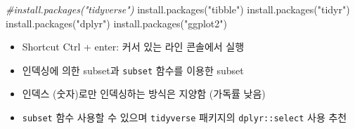 \documentclass[
]{book}
\newenvironment{Shaded}{\begin{snugshade}}{\end{snugshade}}
\newcommand{\AttributeTok}[1]{\textcolor[rgb]{0.77,0.63,0.00}{#1}}
\newcommand{\CommentTok}[1]{\textcolor[rgb]{0.56,0.35,0.01}{\textit{#1}}}
\newcommand{\ConstantTok}[1]{\textcolor[rgb]{0.00,0.00,0.00}{#1}}
\newcommand{\DecValTok}[1]{\textcolor[rgb]{0.00,0.00,0.81}{#1}}
\newcommand{\DocumentationTok}[1]{\textcolor[rgb]{0.56,0.35,0.01}{\textbf{\textit{#1}}}}
\newcommand{\FunctionTok}[1]{\textcolor[rgb]{0.00,0.00,0.00}{#1}}
\newcommand{\NormalTok}[1]{#1}
\newcommand{\OtherTok}[1]{\textcolor[rgb]{0.56,0.35,0.01}{#1}}
\newcommand{\SpecialCharTok}[1]{\textcolor[rgb]{0.00,0.00,0.00}{#1}}
\newcommand{\StringTok}[1]{\textcolor[rgb]{0.31,0.60,0.02}{#1}}
\providecommand{\tightlist}{%
  \setlength{\itemsep}{0pt}\setlength{\parskip}{0pt}}
\begin{document}
\begin{Shaded}
\begin{Highlighting}[]

\CommentTok{\#install.packages("tidyverse")}
\FunctionTok{install.packages}\NormalTok{(}\StringTok{"tibble"}\NormalTok{)}
\FunctionTok{install.packages}\NormalTok{(}\StringTok{"tidyr"}\NormalTok{)}
\FunctionTok{install.packages}\NormalTok{(}\StringTok{"dplyr"}\NormalTok{)}
\FunctionTok{install.packages}\NormalTok{(}\StringTok{"ggplot2"}\NormalTok{)}
\end{Highlighting}
\end{Shaded}

\begin{itemize}
\tightlist
\item
  Shortcut Ctrl + enter: 커서 있는 라인 콘솔에서 실행
\item
  인덱싱에 의한 subset과 \texttt{subset} 함수를 이용한 subset
\end{itemize}

\begin{Shaded}
\end{Shaded}

\begin{itemize}
\tightlist
\item
  인덱스 (숫자)로만 인덱싱하는 방식은 지양함 (가독률 낮음)
\item
  \texttt{subset} 함수 사용할 수 있으며 \texttt{tidyverse} 패키지의 \texttt{dplyr::select} 사용 추천
\end{itemize}
\end{document}
